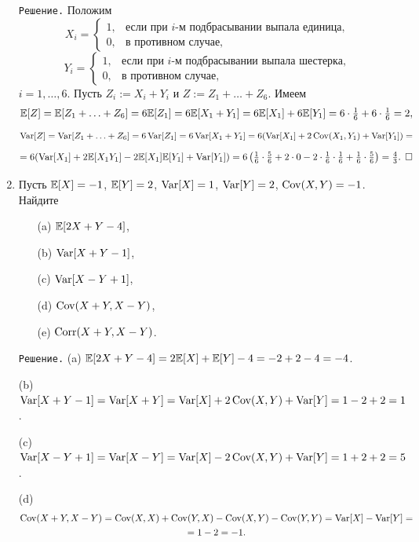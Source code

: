 \documentclass[12pt, a4paper]{article}\usepackage[]{graphicx}\usepackage[]{color}
\begin{document}
\begin{enumerate}
\verb"Решение." Положим
\[
X_i =
            \begin{cases}
                            1,     &   \text{если при $i$-м подбрасывании выпала единица,} \\
                            0,     &   \text{в противном случае,}
            \end{cases}
\]
\[
Y_i =
            \begin{cases}
                            1,     &   \text{если при $i$-м подбрасывании выпала шестерка,} \\
                            0,     &   \text{в противном случае,}
            \end{cases}
\]
$i=1, \ldots, 6$. Пусть $Z_i := X_i + Y_i$ и $Z := Z_1 + \ldots + Z_6$. Имеем
\[
\mathbb{E}[Z] = \mathbb{E}[Z_1 + \ldots + Z_6] = 6\mathbb{E}[Z_1] = 6\mathbb{E}[X_1 + Y_1] = 6\mathbb{E}[X_1] + 6\mathbb{E}[Y_1] = 6\cdot\tfrac{1}{6} + 6\cdot\tfrac{1}{6} = 2,
\]
\[
\operatorname{Var}[Z] = \operatorname{Var}[Z_1 + \ldots + Z_6] = 6\operatorname{Var}[Z_1] = 6\operatorname{Var}[X_1 + Y_1] = 6(\operatorname{Var}[X_1] + 2\operatorname{Cov}(X_1,Y_1) + \operatorname{Var}[Y_1]) =
\]
\[
 = 6(\operatorname{Var}[X_1] + 2\mathbb{E}[X_1Y_1] - 2\mathbb{E}[X_1]\mathbb{E}[Y_1] + \operatorname{Var}[Y_1]) = 6\left( \tfrac{1}{6}\cdot\tfrac{5}{6} + 2\cdot0 - 2\cdot\tfrac{1}{6}\cdot\tfrac{1}{6} + \tfrac{1}{6}\cdot\tfrac{5}{6} \right) = \tfrac{4}{3}\text{. $\Box$}
\]
\item %
Пусть $\mathbb{E}[X] = -1$, $\mathbb{E}[Y] = 2$, $\operatorname{Var}[X] = 1$, $\operatorname{Var}[Y] = 2$, $\operatorname{Cov}(X,Y) = -1$. Найдите
\begin{itemize}
  \item[(a)] $\mathbb{E}[2X+Y-4]$,
  \item[(b)] $\operatorname{Var}[X+Y-1]$,
  \item[(c)] $\operatorname{Var}[X-Y+1]$,
  \item[(d)] $\operatorname{Cov}(X+Y,X-Y)$,
  \item[(e)] $\operatorname{Corr}(X+Y,X-Y)$.
\end{itemize}

\verb"Решение." (a) $\mathbb{E}[2X+Y-4] = 2\mathbb{E}[X] + \mathbb{E}[Y] - 4 = -2 + 2 - 4 = -4$.

(b) $\operatorname{Var}[X+Y-1] = \operatorname{Var}[X+Y] = \operatorname{Var}[X] + 2\operatorname{Cov}(X,Y) + \operatorname{Var}[Y] = 1 - 2 + 2 = 1$.

(c) $\operatorname{Var}[X-Y+1] = \operatorname{Var}[X-Y] = \operatorname{Var}[X] - 2\operatorname{Cov}(X,Y) + \operatorname{Var}[Y] = 1 + 2 + 2 = 5$.

(d)
\begin{multline}
\operatorname{Cov}(X+Y, X-Y) = \operatorname{Cov}(X, X) + \operatorname{Cov}(Y, X) - \operatorname{Cov}(X, Y) - \operatorname{Cov}(Y, Y) = \operatorname{Var}[X] - \operatorname{Var}[Y] = \\
 = 1 - 2 = -1.
\end{multline}


\end{enumerate}
\end{document}
